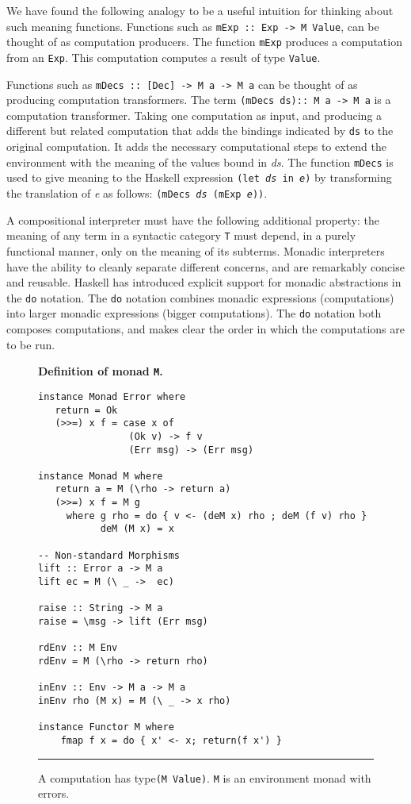 \documentclass{entcs} \usepackage{entcsmacro}
\begin{document}
We have found the following analogy to be a useful intuition for thinking about such
meaning functions. Functions such as {\tt mExp :: Exp -> M Value}, can be thought of as
computation producers. The function {\tt mExp} produces a computation from an {\tt Exp}.
This computation computes a result of type {\tt Value}.

Functions such as {\tt mDecs :: [Dec] -> M a -> M a} can be thought of as producing
computation transformers. The term {\tt (mDecs ds):: M a -> M a} is a computation
transformer. Taking one computation as input, and producing a different but related
computation that adds the bindings indicated by {\tt ds} to the original computation.
It adds the necessary computational steps to extend the environment with the meaning of
the values bound in {\em ds}. The function {\tt mDecs} is used to give meaning to the
Haskell expression {\tt (let {\em ds} in {\em e})} by transforming the translation of
{\em e} as follows: {\tt (mDecs {\em ds} (mExp {\em e}))}.


A compositional interpreter must have the following additional property: the
meaning of any term in a syntactic category {\tt T} must depend, in a purely
functional manner, only on the meaning of its subterms. Monadic interpreters
have the ability to cleanly separate different concerns\cite{Wadler92}, and
are remarkably concise and reusable.  Haskell has introduced explicit support
for monadic abstractions in the  {\tt do} notation. The {\tt do} notation
combines monadic expressions (computations) into larger monadic expressions
(bigger computations). The {\tt do} notation both composes computations, and
makes clear the order in which the computations are to be run.

\begin{figure}
{\small
\begin{center}
{\bf Definition of monad {\tt M}.}
\end{center}
\begin{verbatim}
instance Monad Error where
   return = Ok
   (>>=) x f = case x of
                (Ok v) -> f v
                (Err msg) -> (Err msg)

instance Monad M where
   return a = M (\rho -> return a)
   (>>=) x f = M g
     where g rho = do { v <- (deM x) rho ; deM (f v) rho }
           deM (M x) = x

-- Non-standard Morphisms
lift :: Error a -> M a
lift ec = M (\ _ ->  ec)

raise :: String -> M a
raise = \msg -> lift (Err msg)

rdEnv :: M Env
rdEnv = M (\rho -> return rho)

inEnv :: Env -> M a -> M a
inEnv rho (M x) = M (\ _ -> x rho)

instance Functor M where
    fmap f x = do { x' <- x; return(f x') }
\end{verbatim}
\caption{A computation has type{\tt (M Value)}.
{\tt M} is an environment monad with errors.}\label{Monad}
}
\hrule
\end{figure}
\end{document}
